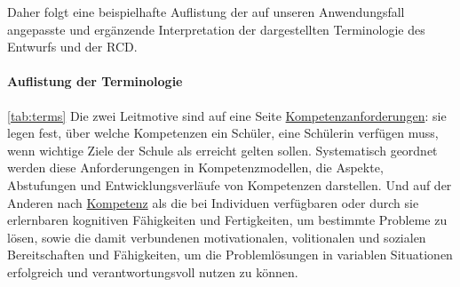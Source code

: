 \documentclass[
12pt,
english,
ngerman,
headsepline,
twoside,
openright,
numbers=noenddot,version=first
]{scrreprt}
\begin{document}
Daher folgt eine beispielhafte Auflistung der auf unseren Anwendungsfall angepasste und ergänzende Interpretation der dargestellten Terminologie des Entwurfs und der RCD.


\paragraph{Auflistung der Terminologie}\ref{tab:terms} Die zwei Leitmotive sind auf eine Seite \underline{Kompetenzanforderungen}: sie legen fest, über welche Kompetenzen ein Schüler, eine Schülerin verfügen muss, wenn wichtige Ziele der Schule als erreicht gelten sollen. Systematisch geordnet werden diese Anforderungengen in Kompetenzmodellen, die Aspekte, Abstufungen und Entwicklungsverläufe von Kompetenzen darstellen\cite{Competence}. Und auf der Anderen nach \underline{\Gls{Kompetenz}} als die bei Individuen verfügbaren oder durch sie erlernbaren kognitiven Fähigkeiten und Fertigkeiten, um bestimmte Probleme zu lösen, sowie die damit verbundenen motivationalen, volitionalen und sozialen Bereitschaften und Fähigkeiten, um die Problemlösungen in variablen Situationen erfolgreich und verantwortungsvoll nutzen zu können\cite{weinert2002leistungsmessungen}.


\end{document}
